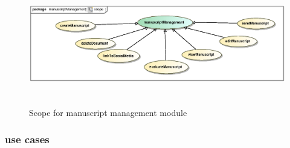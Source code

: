 \documentclass[12pt]{article}
\begin{document}
\begin{figure}[h]
	\includegraphics[height=200px, width=500px]{epsImages/ManuscriptManagement/scope.eps}
	\caption{Scope for manuscript management module}
\end{figure}
\subsubsection{use cases}

\newpage
\end{document}
